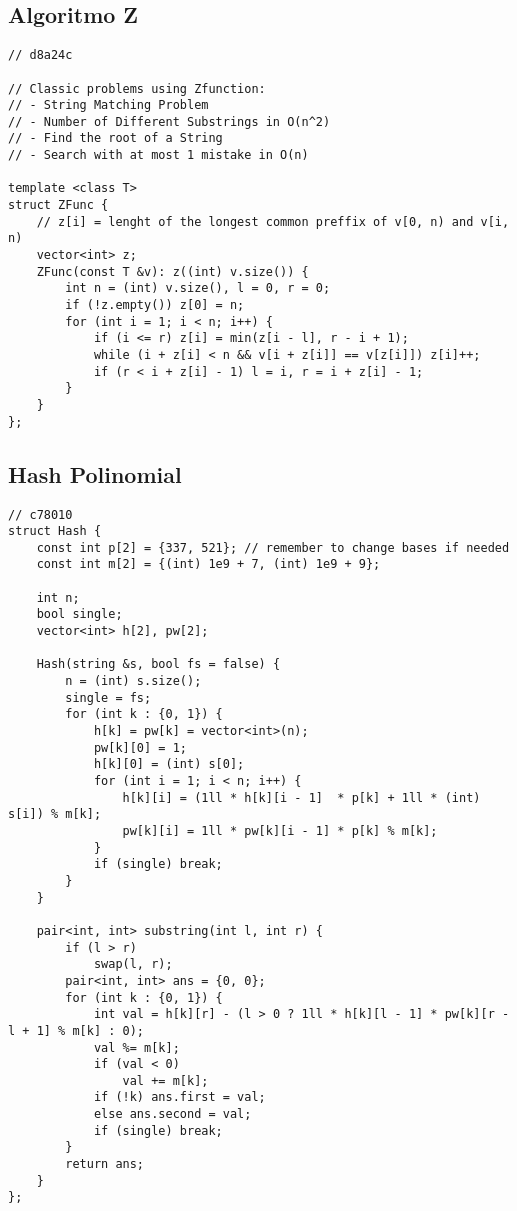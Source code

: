 \documentclass[12pt, a4paper, twoside]{article}
\begin{document}
\subsection{Algoritmo Z
}
\begin{lstlisting}
// d8a24c

// Classic problems using Zfunction:
// - String Matching Problem
// - Number of Different Substrings in O(n^2)
// - Find the root of a String
// - Search with at most 1 mistake in O(n)

template <class T>
struct ZFunc {
	// z[i] = lenght of the longest common preffix of v[0, n) and v[i, n)
	vector<int> z;
	ZFunc(const T &v): z((int) v.size()) {
		int n = (int) v.size(), l = 0, r = 0;
		if (!z.empty()) z[0] = n;
		for (int i = 1; i < n; i++) {
			if (i <= r) z[i] = min(z[i - l], r - i + 1);
			while (i + z[i] < n && v[i + z[i]] == v[z[i]]) z[i]++;
			if (r < i + z[i] - 1) l = i, r = i + z[i] - 1;
		}
	}
};
\end{lstlisting}

\subsection{Hash Polinomial
}
\begin{lstlisting}
// c78010
struct Hash {
	const int p[2] = {337, 521}; // remember to change bases if needed
	const int m[2] = {(int) 1e9 + 7, (int) 1e9 + 9};

	int n;
	bool single;
	vector<int> h[2], pw[2];

	Hash(string &s, bool fs = false) {
		n = (int) s.size();
		single = fs;
		for (int k : {0, 1}) {
			h[k] = pw[k] = vector<int>(n);
			pw[k][0] = 1;
			h[k][0] = (int) s[0];
			for (int i = 1; i < n; i++) {
				h[k][i] = (1ll * h[k][i - 1]  * p[k] + 1ll * (int) s[i]) % m[k];
				pw[k][i] = 1ll * pw[k][i - 1] * p[k] % m[k];
			}
			if (single) break;
		}
	}

	pair<int, int> substring(int l, int r) {
		if (l > r)
			swap(l, r);
		pair<int, int> ans = {0, 0};
		for (int k : {0, 1}) {
			int val = h[k][r] - (l > 0 ? 1ll * h[k][l - 1] * pw[k][r - l + 1] % m[k] : 0);
			val %= m[k];
			if (val < 0)
				val += m[k];
			if (!k) ans.first = val;
			else ans.second = val;
			if (single) break;
		}
		return ans;
	}
};
\end{lstlisting}
\end{document}
